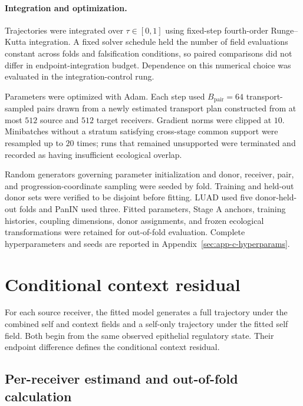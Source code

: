 \paragraph{Integration and optimization.}
Trajectories were integrated over \(\tau\in[0,1]\) using fixed-step
fourth-order Runge--Kutta integration. A fixed solver schedule held the number
of field evaluations constant across folds and falsification conditions, so
paired comparisons did not differ in endpoint-integration budget. Dependence on
this numerical choice was evaluated in the integration-control rung.

Parameters were optimized with Adam. Each step used
\(B_{\mathrm{pair}}=64\) transport-sampled pairs drawn from
a newly estimated transport plan constructed from at most \(512\) source and
\(512\) target receivers. Gradient norms were clipped at \(10\). Minibatches
without a stratum satisfying cross-stage common support were resampled up to
\(20\) times; runs that remained unsupported were terminated and recorded as
having insufficient ecological overlap.

Random generators governing parameter initialization and donor, receiver, pair,
and progression-coordinate sampling were seeded by fold. Training and held-out
donor sets were verified to be disjoint before fitting. LUAD used five
donor-held-out folds and PanIN used three. Fitted parameters, Stage A anchors,
training histories, coupling dimensions, donor assignments, and frozen
ecological transformations were retained for out-of-fold evaluation. Complete
hyperparameters and seeds are reported in
Appendix~\ref{sec:app-c-hyperparams}.


\section{Conditional context residual}
\label{sec:methods-estimand}

For each source receiver, the fitted model generates a full trajectory under
the combined self and context fields and a self-only trajectory under the
fitted self field. Both begin from the same observed epithelial regulatory
state. Their endpoint difference defines the conditional context residual.

\subsection{Per-receiver estimand and out-of-fold calculation}
\label{sec:methods-estimand-receiver}
\label{sec:methods-estimand-out-of-fold}

